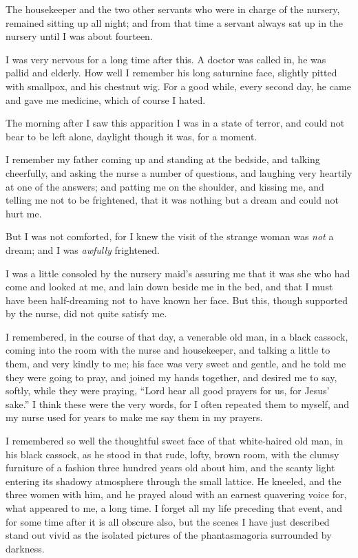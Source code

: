 \documentclass[11pt,twoside,makeidx,hidelinks,]{memoir}
\begin{document}
The housekeeper and the two other servants who were in charge of the
nursery, remained sitting up all night; and from that time a servant
always sat up in the nursery until I was about fourteen.

I was very nervous for a long time after this. A doctor was called in,
he was pallid and elderly. How well I remember his long saturnine face,
slightly pitted with smallpox, and his chestnut wig. For a good while,
every second day, he came and gave me medicine, which of course I hated.

The morning after I saw this apparition I was in a state of terror, and
could not bear to be left alone, daylight though it was, for a moment.

I remember my father coming up and standing at the bedside, and talking
cheerfully, and asking the nurse a number of questions, and laughing
very heartily at one of the answers; and patting me on the shoulder, and
kissing me, and telling me not to be frightened, that it was nothing but
a dream and could not hurt me.

But I was not comforted, for I knew the visit of the strange woman was
\emph{not} a dream; and I was \emph{awfully} frightened.

I was a little consoled by the nursery maid's assuring me that it was
she who had come and looked at me, and lain down beside me in the bed,
and that I must have been half-dreaming not to have known her face. But
this, though supported by the nurse, did not quite satisfy me.

I remembered, in the course of that day, a venerable old man, in a black
cassock, coming into the room with the nurse and housekeeper, and
talking a little to them, and very kindly to me; his face was very sweet
and gentle, and he told me they were going to pray, and joined my hands
together, and desired me to say, softly, while they were praying, ``Lord
hear all good prayers for us, for Jesus' sake.'' I think these were the
very words, for I often repeated them to myself, and my nurse used for
years to make me say them in my prayers.

I remembered so well the thoughtful sweet face of that white-haired old
man, in his black cassock, as he stood in that rude, lofty, brown room,
with the clumsy furniture of a fashion three hundred years old about
him, and the scanty light entering its shadowy atmosphere through the
small lattice. He kneeled, and the three women with him, and he prayed
aloud with an earnest quavering voice for, what appeared to me, a long
time. I forget all my life preceding that event, and for some time after
it is all obscure also, but the scenes I have just described stand out
vivid as the isolated pictures of the phantasmagoria surrounded
by darkness.
\end{document}
